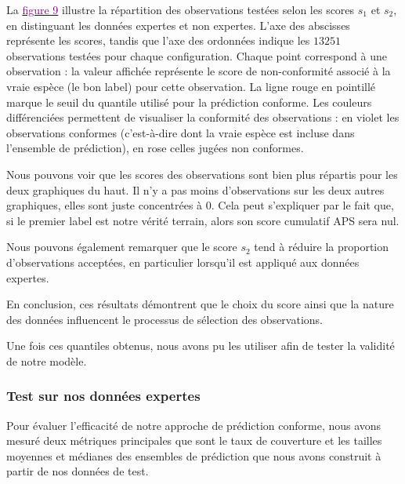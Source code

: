 \documentclass[a4paper,12pt]{article}
\begin{document}
La \hyperref[fig:quantiles]{\textcolor{purple}{figure 9}} illustre la répartition des observations testées selon les scores $s_1$ et $s_2$, en distinguant les données expertes et non expertes. L’axe des abscisses représente les scores, tandis que l’axe des ordonnées indique les $\num{13251}$ observations testées pour chaque configuration. Chaque point correspond à une observation : la valeur affichée représente le score de non-conformité associé à la vraie espèce (le bon label) pour cette observation. La ligne rouge en pointillé marque le seuil du quantile utilisé pour la prédiction conforme. Les couleurs différenciées permettent de visualiser la conformité des observations : en violet les observations conformes (c’est-à-dire dont la vraie espèce est incluse dans l’ensemble de prédiction), en rose celles jugées non conformes.

\vspace{0.2cm}

Nous pouvons voir que les scores des observations sont bien plus répartis pour les deux graphiques du haut. Il n'y a pas moins d'observations sur les deux autres graphiques, elles sont juste concentrées à $0$. Cela peut s'expliquer par le fait que, si le premier label est notre vérité terrain, alors son score cumulatif APS sera nul.

\vspace{0.2cm}

Nous pouvons également remarquer que le score $s_2$ tend à réduire la proportion d’observations acceptées, en particulier lorsqu’il est appliqué aux données expertes.

\vspace{0.2cm}

En conclusion, ces résultats démontrent que le choix du score ainsi que la nature des données influencent le processus de sélection des observations.

\vspace{0.2cm}

Une fois ces quantiles obtenus, nous avons pu les utiliser afin de tester la validité de notre modèle.

\subsubsection{Test sur nos données expertes}

Pour évaluer l'efficacité de notre approche de prédiction conforme, nous avons mesuré deux métriques principales que sont le taux de couverture et les tailles moyennes et médianes des ensembles de prédiction que nous avons construit à partir de nos données de test. 
\end{document}
